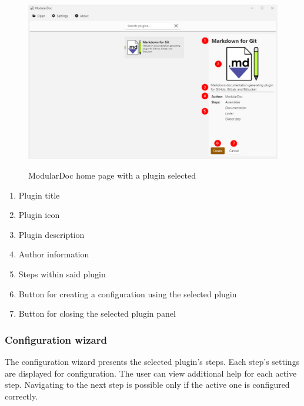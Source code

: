 \begin{figure}[H]
    \includegraphics[width=\linewidth]{img/modularDocPluginSelected.png}
    \label{fig:modularDocPluginSelected}
    \caption{ModularDoc home page with a plugin selected}
\end{figure}

\begin{enumerate}
    \item Plugin title
    \item Plugin icon
    \item Plugin description
    \item Author information
    \item Steps within said plugin
    \item Button for creating a configuration using the selected plugin
    \item Button for closing the selected plugin panel
\end{enumerate}

\pagebreak
\subsubsection{Configuration wizard}

The configuration wizard presents the selected plugin's steps. Each step's settings are displayed for configuration. The user can view additional help for each active step. Navigating to the next step is possible only if the active one is configured correctly.

